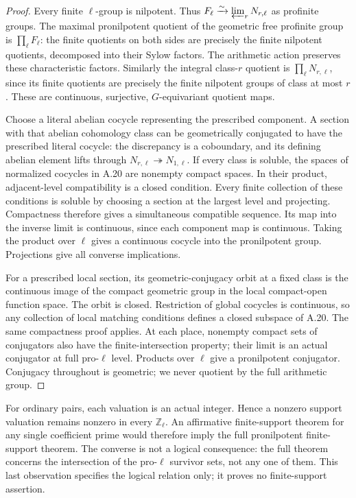 \begin{proof}
Every finite $\ell$-group is nilpotent. Thus
$F_\ell\xrightarrow{\sim}\varprojlim_rN_{r,\ell}$ as profinite
groups. The maximal pronilpotent quotient of the geometric free
profinite group is $\prod_\ell F_\ell$: the finite quotients on
both sides are precisely the finite nilpotent quotients, decomposed
into their Sylow factors. The arithmetic action preserves these
characteristic factors. Similarly the integral class-$r$ quotient is
$\prod_\ell N_{r,\ell}$, since its finite quotients are precisely
the finite nilpotent groups of class at most $r$. These are continuous,
surjective, $G$-equivariant quotient maps.

Choose a literal abelian cocycle representing the prescribed component.
A section with that abelian cohomology class can be geometrically
conjugated to have the prescribed literal cocycle: the discrepancy is a
coboundary, and its defining abelian element lifts through
$N_{r,\ell}\twoheadrightarrow N_{1,\ell}$. If every class is
soluble, the spaces of normalized cocycles in A.20 are nonempty compact
spaces. In their product, adjacent-level compatibility is a closed
condition. Every finite collection of these conditions is soluble by
choosing a section at the largest level and projecting. Compactness
therefore gives a simultaneous compatible sequence. Its map into the
inverse limit is continuous, since each component map is continuous.
Taking the product over $\ell$ gives a continuous cocycle into the
pronilpotent group. Projections give all converse implications.

For a prescribed local section, its geometric-conjugacy orbit at a
fixed class is the continuous image of the compact geometric group
in the local compact-open function space. The orbit is closed.
Restriction of global cocycles is continuous, so any collection of
local matching conditions defines a closed subspace of A.20. The same
compactness proof applies. At each place, nonempty compact sets of
conjugators also have the finite-intersection property; their limit is
an actual conjugator at full pro-$\ell$ level. Products over $\ell$
give a pronilpotent conjugator. Conjugacy throughout is geometric;
we never quotient by the full arithmetic group.
\end{proof}

For ordinary pairs, each valuation is an actual integer. Hence a nonzero
support valuation remains nonzero in every $\mathbb Z_\ell$.
An affirmative finite-support theorem for any single coefficient prime
would therefore imply the full pronilpotent finite-support theorem.
The converse is not a logical consequence: the full theorem concerns
the intersection of the pro-$\ell$ survivor sets, not any one of them.
This last observation specifies the logical relation only; it proves no
finite-support assertion.

